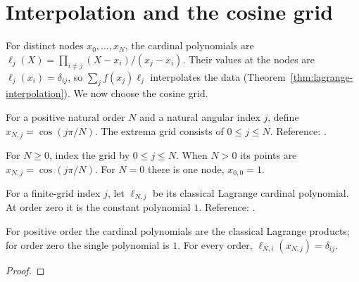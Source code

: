 \section{Interpolation and the cosine grid}\label{sec:textbook-interpolation-grid}

For distinct nodes $x_0,\ldots,x_N$, the cardinal polynomials are $\ell_j(X)=\prod_{i\ne j}(X-x_i)/(x_j-x_i)$. Their values at the nodes are $\ell_j(x_i)=\delta_{ij}$, so $\sum_j f(x_j)\ell_j$ interpolates the data (Theorem~\ref{thm:lagrange-interpolation}). We now choose the cosine grid.

\begin{definition}
\label{def:classical-chebyshev-nodes}
\leanok
For a positive natural order $N$ and a natural angular index $j$, define
$x_{N,j}=\cos(j\pi/N)$. The extrema grid consists of $0\le j\le N$.
Reference: \cite[Chapter 4]{atap}.
\end{definition}

\begin{definition}
\label{def:extrema-grid}
\leanok
For $N\ge0$, index the grid by $0\le j\le N$. When $N>0$ its points are
$x_{N,j}=\cos(j\pi/N)$. For $N=0$ there is one node, $x_{0,0}=1$.
\end{definition}

\begin{definition}
\label{def:extrema-cardinal}
\leanok
For a finite-grid index $j$, let $\ell_{N,j}$ be its classical Lagrange
cardinal polynomial. At order zero it is the constant polynomial $1$.
Reference: \cite[Chapter 4]{atap}.
\end{definition}

\begin{theorem}
\label{thm:extrema-cardinal}
\leanok
For positive order the cardinal polynomials are the classical Lagrange products;
for order zero the single polynomial is $1$. For every order,
$\ell_{N,i}(x_{N,j})=\delta_{ij}$.
\end{theorem}
\begin{proof}
\leanok
\end{proof}

